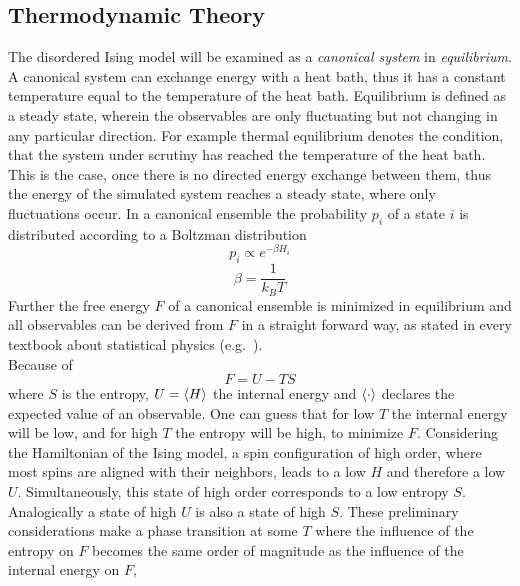 \subsection{Thermodynamic Theory}
\label{ssec:theory}
    The disordered Ising model will be examined as a \emph{canonical system} in
    \emph{equilibrium}. A canonical system can exchange energy with a
    heat bath, thus it has a constant temperature equal to the temperature of the
    heat bath.
    Equilibrium is defined as a steady state, wherein
    the observables are only fluctuating but not changing in any
    particular direction. For example thermal equilibrium denotes the
    condition, that the system under scrutiny has reached the temperature
    of the heat bath. This is the case, once there is no directed energy
    exchange between them, thus the energy of the simulated system reaches
    a steady state, where only fluctuations occur.
    In a canonical ensemble the probability \(p_i\) of a state
    \(i\) is distributed according to a Boltzman distribution
    \begin{equation}
        p_i \propto e^{-\beta H_i}
    \end{equation}
    \begin{equation}
        \beta = \frac{1}{k_B T}
    \end{equation}
    Further the free energy \(F\) of a canonical ensemble is minimized
    in equilibrium and all observables can be derived from \(F\)
    in a straight forward way, as stated in every textbook about
    statistical physics (e.g.\ \cite{nolting2005}).\\
    Because of
    \begin{equation}
        F = U - TS
    \end{equation}
    where \(S\) is the entropy, \(U=\left< H \right>\) the internal energy and
    \(\left< \cdot \right>\) declares the expected value of an observable.
    One can guess that for low \(T\) the internal energy
    will be low, and for high \(T\) the entropy will be high, to minimize
    \(F\).
    Considering the Hamiltonian of the Ising model, a spin configuration
    of high order, where most spins are aligned with their neighbors,
    leads to a low \(H\) and therefore a low \(U\). Simultaneously, this
    state of high order corresponds to a low entropy \(S\).
    Analogically a state of high \(U\) is also a state of high \(S\).
    These preliminary considerations make a phase transition at some
    \(T\) where the influence of the entropy on \(F\) becomes the same
    order of magnitude as the influence of the internal energy on \(F\),
